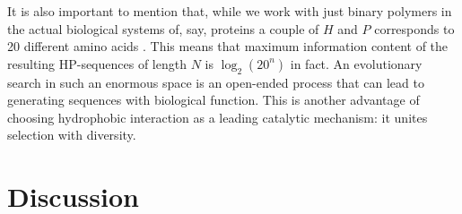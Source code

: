 \documentclass[journal=jacsat,manuscript=article,layout=twocolumn]{achemso}
\begin{document}
It is also important to mention that, while we work with just binary polymers in the actual 
biological systems of, say, proteins a couple of $H$ and $P$ corresponds to 20 different amino 
acids . This means that maximum information content of the resulting HP-sequences of length $N$ is 
$\log_2(20^n)$ in fact. An evolutionary search in such an enormous space is an open-ended process 
that can lead to generating sequences with biological function. This is another advantage of 
choosing hydrophobic interaction as a leading catalytic mechanism: it unites selection with 
diversity.

\section{Discussion}
\end{document}
